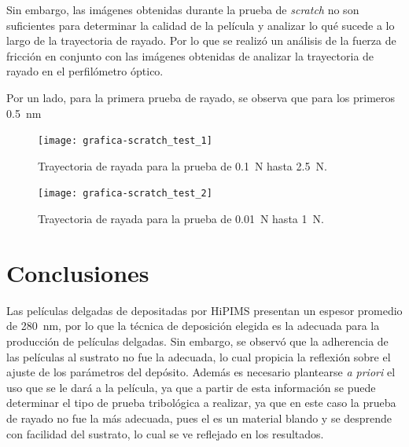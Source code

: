 \documentclass[12pt]{IEEEtran}
\begin{document}
Sin embargo, las imágenes obtenidas durante la prueba de \emph{scratch} no son suficientes para determinar la calidad de la película y analizar lo qué sucede a lo largo de la trayectoria de rayado. Por lo que se realizó un análisis de la fuerza de fricción en conjunto con las imágenes obtenidas de analizar la trayectoria de rayado en el perfilómetro óptico.

Por un lado, para la primera prueba de rayado, se observa que para los primeros \qty{0.5}{\nm}

\begin{figure}[htb]
	\centering
	\texttt{[image: grafica-scratch\_test\_1]}
	\caption{Trayectoria de rayada para la prueba de \qty{0.1}{\N} hasta \qty{2.5}{\N}.}
	\label{fig:scratch-test-1}
\end{figure}%
\vspace{0.5cm}
\begin{figure}[htb]
	\centering
	\texttt{[image: grafica-scratch\_test\_2]}
	\caption{Trayectoria de rayada para la prueba de \qty{0.01}{\N} hasta \qty{1}{\N}.}
	\label{fig:scratch-test-2}
\end{figure}

\section{Conclusiones}

Las películas delgadas de  depositadas por HiPIMS presentan un espesor promedio de \qty{280}{\nm}, por lo que la técnica de deposición elegida es la adecuada para la producción de películas delgadas. Sin embargo, se observó que la adherencia de las películas al sustrato no fue la adecuada, lo cual propicia la reflexión sobre el ajuste de los parámetros del depósito. Además es necesario plantearse \emph{a priori} el uso que se le dará a la película, ya que a partir de esta información se puede determinar el tipo de prueba tribológica a realizar, ya que en este caso la prueba de rayado no fue la más adecuada, pues el  es un material blando y se desprende con facilidad del sustrato, lo cual se ve reflejado en los resultados.

\nocite{*}
\printbibliography
\end{document}

